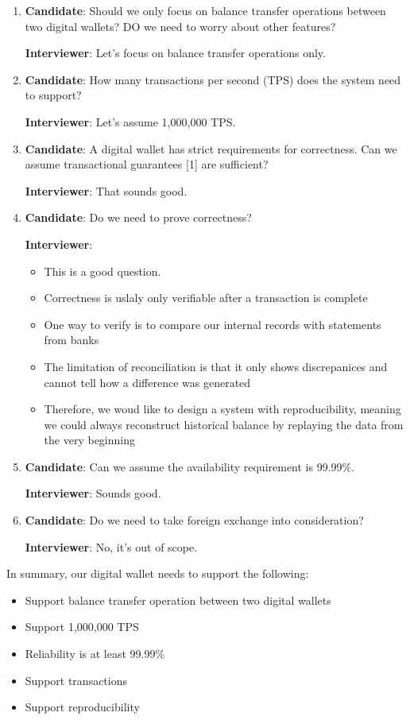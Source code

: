 \documentclass{report}
\theoremstyle{definition}
\begin{document}
\begin{enumerate}
\item

\textbf{Candidate}: Should we only focus on balance transfer operations between two digital wallets? DO we need to worry about other features?

\textbf{Interviewer}: Let's focus on balance transfer operations only.
\item
\textbf{Candidate}: How many transactions per second (TPS) does the system need to support?

\textbf{Interviewer}: Let's assume 1,000,000 TPS.
\item
\textbf{Candidate}: A digital wallet has strict requirements for correctness. Can we assume transactional guarantees [1] are sufficient?

\textbf{Interviewer}: That sounds good.

\item
\textbf{Candidate}: Do we need to prove correctness?

\textbf{Interviewer}:

\begin{itemize}
\item
This is a good question.
\item
Correctness is uslaly only verifiable after a transaction is complete
\item
One way to verify is to compare our internal records with statements from banks
\item
The limitation of reconciliation is that it only shows discrepanices and cannot tell how a difference was generated
\item
Therefore, we woud like to design a system with reproducibility, meaning we could always reconstruct historical balance by replaying the data from the very beginning
\end{itemize}

\item
\textbf{Candidate}: Can we assume the availability requirement is 99.99\%.

\textbf{Interviewer}: Sounds good.
\item
\textbf{Candidate}: Do we need to take foreign exchange into consideration?

\textbf{Interviewer}: No, it's out of scope.
\end{enumerate}

In summary, our digital wallet needs to support the following:

\begin{itemize}
\item
Support balance transfer operation between two digital wallets
\item
Support 1,000,000 TPS
\item
Reliability is at least 99.99\%
\item
Support transactions
\item
Support reproducibility
\end{itemize}
\end{document}

